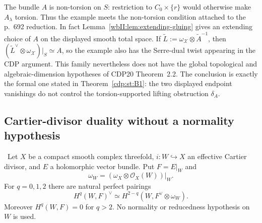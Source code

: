 \begin{remark}
\label{wbII:rem:scope}
The bundle $A$ is non-torsion on $S$: restriction to
\(C_0\times\{r\}\) would otherwise make $A_\lambda$ torsion.  Thus the
example meets the non-torsion condition attached to the p.~692 reduction.
In fact Lemma~\ref{wbII:lem:extending-gluing} gives an extending choice of $A$ on
the displayed smooth total space.  If $\widetilde L:=\omega_{\mathcal X}\otimes
\widetilde A^{-1}$, then
$(\widetilde L^\vee\otimes\omega_{\mathcal X})|_S\simeq A$, so the example
also has the Serre-dual twist appearing in the CDP argument.  This family
nevertheless does not have
the global topological and algebraic-dimension hypotheses of CDP20
Theorem~2.2.  The conclusion is exactly the formal one stated in
Theorem~\ref{cdp:st:B1}: the two displayed endpoint vanishings do not
control the torsion-supported lifting obstruction $\delta_A$.
\end{remark}

\subsection{Cartier-divisor duality without a normality hypothesis}

\begin{theorem}
\label{wbII:thm:cartier-duality}
\ Let $X$ be a compact smooth complex threefold,
$i:W\hookrightarrow X$ an effective Cartier divisor, and $E$ a holomorphic
vector bundle.  Put $F=E|_W$ and
\[
\omega_W=(\omega_X\otimes\mathcal O_X(W))|_W.
\]
For $q=0,1,2$ there are natural perfect pairings
\[
H^q(W,F)^\vee
\simeq H^{2-q}(W,F^\vee\otimes\omega_W).
\tag{W.11}\label{wbII:eq:W:5.11}
\]
Moreover $H^q(W,F)=0$ for $q>2$.  No normality or reducedness hypothesis on
$W$ is used.
\end{theorem}

